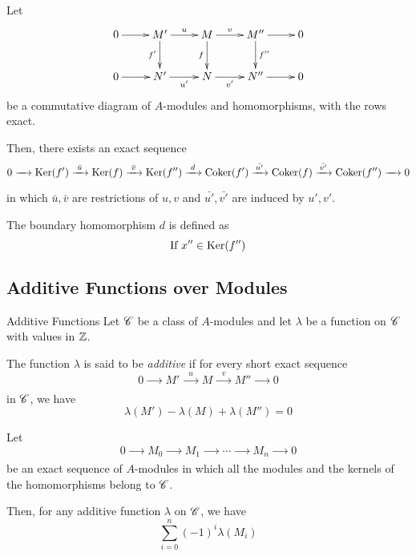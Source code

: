 \begin{proposition}{}{}
	Let
	\begin{align*}
		\xymatrix{
			0 \ar[r] & M' \ar[d]_-{f'} \ar[r]^-{u} & M
			\ar[d]_-{f} \ar[r]^-{v} & M''
			\ar[d]^-{f''} \ar[r] & 0 \\
			0 \ar[r] & N' \ar[r]_-{u'} & N
			\ar[r]_-{v'} & N'' \ar[r] & 0
		}
	\end{align*}
	be a commutative diagram of \(A\)-modules and homomorphisms,
	with the rows exact.

	Then, there exists an exact sequence
	\begin{align*}
		0 \xrightarrow[\quad]{} \operatorname{Ker}(f')
		\xrightarrow[\quad]{\bar{u}} \operatorname{Ker}(f)
		\xrightarrow[\quad]{\bar{v}} \operatorname{Ker}(f'')
		\xrightarrow[\quad]{d} \operatorname{Coker}(f')
		\xrightarrow[\quad]{\bar{u'}} \operatorname{Coker}(f)
		\xrightarrow[\quad]{\bar{v'}} \operatorname{Coker}(f'')
		\xrightarrow[\quad]{} 0
	\end{align*}
	in which \(\bar{u}, \bar{v}\) are restrictions of \(u, v\)
	and \(\bar{u'}, \bar{v'}\) are induced by \(u', v'\).

	The boundary homomorphism \(d\) is defined as
	\[
		\text{If } x'' \in \operatorname{Ker}(f'')
	\]
\end{proposition}


\subsection{Additive Functions over Modules}

\begin{defn}{Additive Functions}{}
	Let \({\mathscr{C}}\) be a class of \(A\)-modules and let \(\lambda\) be a function
	on \({\mathscr{C}}\) with values in \(\ZZ\).

	The function \(\lambda\) is said to be \emph{additive} if for
	every short exact sequence
	\[
		0 \xrightarrow[\quad\quad]{}
		M' \xrightarrow[\quad\quad]{u}
		M \xrightarrow[\quad\quad]{v}
		M'' \xrightarrow[\quad\quad]{} 0
	\]
	in \({\mathscr{C}}\), we have
	\[
		\lambda(M') - \lambda(M) + \lambda(M'') = 0
	\]
\end{defn}

\begin{proposition}{}{}
	Let
	\[
		0 \xrightarrow[\quad\quad]{} M_0 \xrightarrow[\quad\quad]{}
		M_1 \xrightarrow[\quad\quad]{} \cdots
		\xrightarrow[\quad\quad]{} M_n \xrightarrow[\quad\quad]{} 0
	\]
	be an exact sequence of \(A\)-modules in which all the modules
	and the kernels of the homomorphisms belong to \({\mathscr{C}}\).

	Then, for any additive function \(\lambda\) on \({\mathscr{C}}\), we have
	\[
		\sum_{i=0}^n (-1)^i \lambda(M_i)
	\]
\end{proposition}


